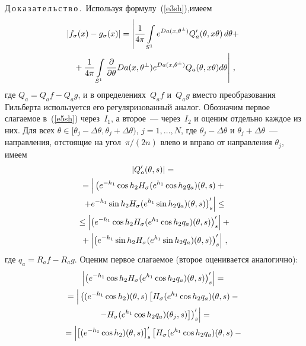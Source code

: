 \begin{multicols}{2}
\medskip

\noindent
Д\,о\,к\,а\,з\,а\,т\,е\,л\,ь\,с\,т\,в\,о\,.\ Используя формулу~(\ref{e3sh}),\linebreak имеем
\begin{multline}
\left|f_{\sigma}(x)-g_{\sigma}(x)\right|=\left|\displaystyle\frac{\displaystyle 1\mathstrut}{\displaystyle 4\pi\mathstrut}\int\limits_{S^1}e^{Da(x,\theta^{\perp})}
Q'_a(\theta,x\theta)\,d\theta+\right.{}\\
\left. {}+\displaystyle\frac{\displaystyle 1\mathstrut}{\displaystyle 4\pi\mathstrut}\int\limits_{S^1}\displaystyle\frac{\displaystyle \partial\mathstrut}{\displaystyle \partial\theta\mathstrut}Da(x,\theta^{\perp})
e^{Da(x,\theta^{\perp})}Q_a(\theta,x\theta)d\theta\right|\,,\label{e5sh}
\end{multline}
где $Q_a=Q_af-Q_ag$, и в определениях~$Q_af$ и~$Q_ag$ вместо преобразования Гильберта используется его 
регуляризованный аналог. Обозначим первое слагаемое в~(\ref{e5sh})
через~$I_1$, а второе~--- через~$I_2$ и оценим отдельно каждое из них. 
Для всех $\theta\in[\theta_j-\Delta\theta,\theta_j+\Delta\theta)$, $j=1,\ldots ,N$,
где $\theta_j-\Delta\theta$ и $\theta_j+\Delta\theta$~--- направления, отстоящие на угол~$\pi/(2n)$ 
влево и вправо от на\-прав\-ле\-ния $\theta_j$, имеем 
\begin{multline*}
\abs{Q'_a(\theta,s)}={}\\
{}= \left|
\vphantom{{}=\left.\left.+e^{-h_1}\sin{h_2}H_\sigma(e^{h_1}\sin{h_2}q_a)(\theta,s)\right)'_s\right| \leq{}}
\left(e^{-h_1}\cos{h_2}H_\sigma(e^{h_1}\cos{h_2}q_a)(\theta,s)+{}\right.\right.\\
{}\left.\left.+e^{-h_1}\sin{h_2}H_\sigma(e^{h_1}\sin{h_2}q_a)(\theta,s)\right)'_s\right| \leq{}\\
{}\leq\left| \left(e^{-h_1}\cos{h_2}H_\sigma(e^{h_1}\cos{h_2}q_a)(\theta,s)\right)'_s\right|+{}\\
{}+\left| \left(e^{-h_1}\sin{h_2}H_\sigma(e^{h_1}\sin{h_2}q_a)(\theta,s)\right)'_s\right| \,,
\end{multline*}
где $q_a=R_af-R_ag$. Оценим первое слагаемое (второе оценивается аналогично):
\begin{multline*}
\left| \left(e^{-h_1}\cos{h_2}H_\sigma(e^{h_1}\cos{h_2}q_a)(\theta,s)\right)'_s\right| ={}\\
{}=\left| 
\vphantom{{}\left.\left.+e^{-h_1}\sin{h_2}H_\sigma(e^{h_1}\sin{h_2}q_a)(\theta,s)\right)'_s\right| \leq{}}
\left((e^{-h_1}\cos{h_2})(\theta,s)\left [H_\sigma(e^{h_1}\cos{h_2}q_a)(\theta,s)-{}\right.\right.\right.\\
{}\left.\left.\left.-H_\sigma(e^{h_1}\cos{h_2}q_a)(\theta_j,s)\right ]\right)'_s\right| ={}\\
{}=\left| \left[(e^{-h_1}\cos{h_2})(\theta,s)\right]'_s\left [H_\sigma(e^{h_1}\cos{h_2}q_a)(\theta,s)-{}\right.\right.\\

\end{multline*}
\end{multicols}
